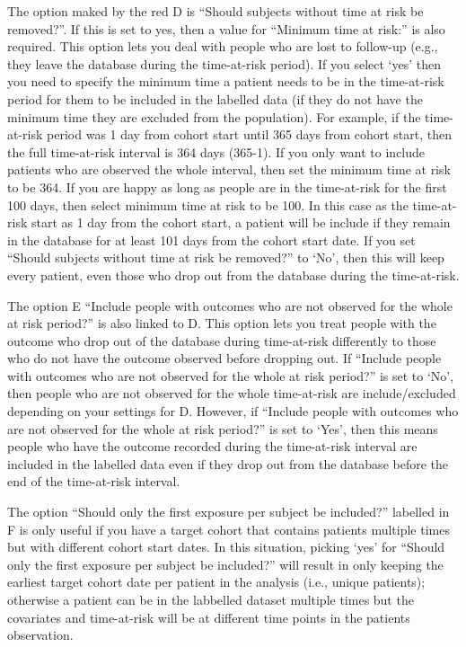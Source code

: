 \documentclass[11pt]{book}
\begin{document}
The option maked by the red D is ``Should subjects without time at risk
be removed?''. If this is set to yes, then a value for ``Minimum time at
risk:'' is also required. This option lets you deal with people who are
lost to follow-up (e.g., they leave the database during the time-at-risk
period). If you select `yes' then you need to specify the minimum time a
patient needs to be in the time-at-risk period for them to be included
in the labelled data (if they do not have the minimum time they are
excluded from the population). For example, if the time-at-risk period
was 1 day from cohort start until 365 days from cohort start, then the
full time-at-risk interval is 364 days (365-1). If you only want to
include patients who are observed the whole interval, then set the
minimum time at risk to be 364. If you are happy as long as people are
in the time-at-risk for the first 100 days, then select minimum time at
risk to be 100. In this case as the time-at-risk start as 1 day from the
cohort start, a patient will be include if they remain in the database
for at least 101 days from the cohort start date. If you set ``Should
subjects without time at risk be removed?'' to `No', then this will keep
every patient, even those who drop out from the database during the
time-at-risk.

The option E ``Include people with outcomes who are not observed for the
whole at risk period?'' is also linked to D. This option lets you treat
people with the outcome who drop out of the database during time-at-risk
differently to those who do not have the outcome observed before
dropping out. If ``Include people with outcomes who are not observed for
the whole at risk period?'' is set to `No', then people who are not
observed for the whole time-at-risk are include/excluded depending on
your settings for D. However, if ``Include people with outcomes who are
not observed for the whole at risk period?'' is set to `Yes', then this
means people who have the outcome recorded during the time-at-risk
interval are included in the labelled data even if they drop out from
the database before the end of the time-at-risk interval.

The option ``Should only the first exposure per subject be included?''
labelled in F is only useful if you have a target cohort that contains
patients multiple times but with different cohort start dates. In this
situation, picking `yes' for ``Should only the first exposure per
subject be included?'' will result in only keeping the earliest target
cohort date per patient in the analysis (i.e., unique patients);
otherwise a patient can be in the labbelled dataset multiple times but
the covariates and time-at-risk will be at different time points in the
patients observation.
\end{document}
